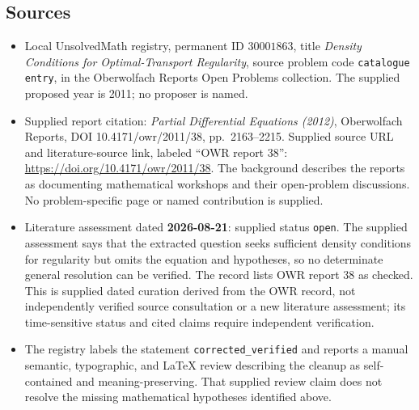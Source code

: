 \documentclass[11pt]{article}
\begin{document}
\subsection{Sources}
\begin{itemize}
\item Local UnsolvedMath registry, permanent ID \(30001863\), title \emph{Density Conditions for Optimal-Transport Regularity}, source problem code \texttt{catalogue entry}, in the Oberwolfach Reports Open Problems collection. The supplied proposed year is 2011; no proposer is named.
\item Supplied report citation: \emph{Partial Differential Equations (2012)}, Oberwolfach Reports, DOI 10.4171/owr/2011/38, pp.\ 2163--2215. Supplied source URL and literature-source link, labeled ``OWR report 38'': \url{https://doi.org/10.4171/owr/2011/38}. The background describes the reports as documenting mathematical workshops and their open-problem discussions. No problem-specific page or named contribution is supplied.
\item Literature assessment dated \textbf{2026-08-21}: supplied status \texttt{open}. The supplied assessment says that the extracted question seeks sufficient density conditions for regularity but omits the equation and hypotheses, so no determinate general resolution can be verified. The record lists OWR report 38 as checked. This is supplied dated curation derived from the OWR record, not independently verified source consultation or a new literature assessment; its time-sensitive status and cited claims require independent verification.
\item The registry labels the statement \texttt{corrected\_verified} and reports a manual semantic, typographic, and LaTeX review describing the cleanup as self-contained and meaning-preserving. That supplied review claim does not resolve the missing mathematical hypotheses identified above.
\end{itemize}
\end{document}
